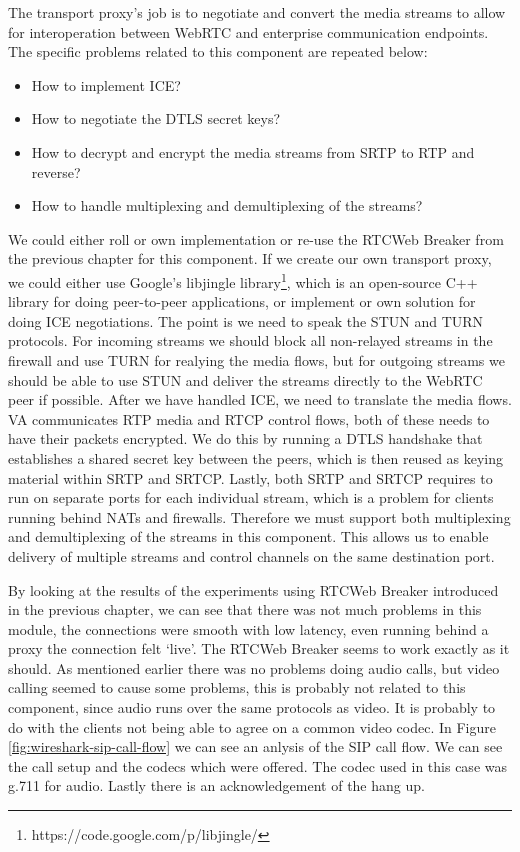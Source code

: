 The transport proxy's job is to negotiate and convert the media streams to allow for interoperation between WebRTC and enterprise communication endpoints. The specific problems related to this component are repeated below:

\begin{itemize}
\item{How to implement ICE?}
\item{How to negotiate the DTLS secret keys?}
\item{How to decrypt and encrypt the media streams from SRTP to RTP and reverse?}
\item{How to handle multiplexing and demultiplexing of the streams?}
\end{itemize}

We could either roll or own implementation or re-use the RTCWeb Breaker from the previous chapter for this component. If we create our own transport proxy, we could either use Google's libjingle library\footnote{https://code.google.com/p/libjingle/}, which is an open-source C++ library for doing peer-to-peer applications, or implement or own solution for doing ICE negotiations. The point is we need to speak the STUN and TURN protocols. For incoming streams we should block all non-relayed streams in the firewall and use TURN for realying the media flows, but for outgoing streams we should be able to use STUN and deliver the streams directly to the WebRTC peer if possible. After we have handled ICE, we need to translate the media flows. VA communicates RTP media and RTCP control flows, both of these needs to have their packets encrypted. We do this by running a DTLS handshake that establishes a shared secret key between the peers, which is then reused as keying material within SRTP and SRTCP. Lastly, both SRTP and SRTCP requires to run on separate ports for each individual stream, which is a problem for clients running behind NATs and firewalls. Therefore we must support both multiplexing and demultiplexing of the streams in this component. This allows us to enable delivery of multiple streams and control channels on the same destination port.

By looking at the results of the experiments using RTCWeb Breaker introduced in the previous chapter, we can see that there was not much problems in this module, the connections were smooth with low latency, even running behind a proxy the connection felt `live'. The RTCWeb Breaker seems to work exactly as it should. As mentioned earlier there was no problems doing audio calls, but video calling seemed to cause some problems, this is probably not related to this component, since audio runs over the same protocols as video. It is probably to do with the clients not being able to agree on a common video codec. In Figure \ref{fig:wireshark-sip-call-flow} we can see an anlysis of the SIP call flow. We can see the call setup and the codecs which were offered. The codec used in this case was g.711 for audio. Lastly there is an acknowledgement of the hang up.

